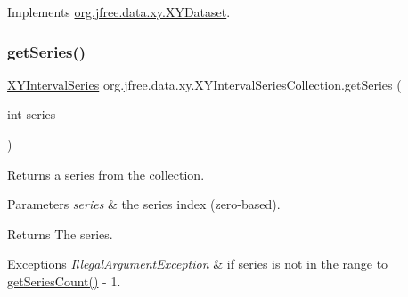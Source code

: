 Implements \mbox{\hyperlink{interfaceorg_1_1jfree_1_1data_1_1xy_1_1_x_y_dataset_ae81f9de91dfcae45028fc8a486a119da}{org.\+jfree.\+data.\+xy.\+X\+Y\+Dataset}}.

\mbox{\label{classorg_1_1jfree_1_1data_1_1xy_1_1_x_y_interval_series_collection_af253956a1bbd6db01a8429adc3268725}} 
\subsubsection{\texorpdfstring{get\+Series()}{getSeries()}}
{\footnotesize\ttfamily \mbox{\hyperlink{classorg_1_1jfree_1_1data_1_1xy_1_1_x_y_interval_series}{X\+Y\+Interval\+Series}} org.\+jfree.\+data.\+xy.\+X\+Y\+Interval\+Series\+Collection.\+get\+Series (\begin{DoxyParamCaption}\item[{int}]{series }\end{DoxyParamCaption})}

Returns a series from the collection.


\begin{DoxyParams}{Parameters}
{\em series} & the series index (zero-\/based).\\
\hline
\end{DoxyParams}
\begin{DoxyReturn}{Returns}
The series.
\end{DoxyReturn}

\begin{DoxyExceptions}{Exceptions}
{\em Illegal\+Argument\+Exception} & if {\ttfamily series} is not in the range {} to {\ttfamily \mbox{\hyperlink{classorg_1_1jfree_1_1data_1_1xy_1_1_x_y_interval_series_collection_aae35bb3146172522ddd725598891b555}{get\+Series\+Count()}} -\/ 1}. \\
\hline
\end{DoxyExceptions}
\mbox{\label{classorg_1_1jfree_1_1data_1_1xy_1_1_x_y_interval_series_collection_aae35bb3146172522ddd725598891b555}} 
